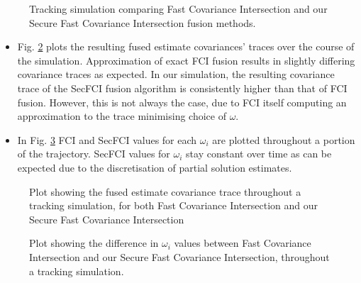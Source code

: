\documentclass[letterpaper, 10 pt, conference]{ieeeconf}  %
\begin{document}
\begin{figure}[tb]
   \begin{center}
      
   \end{center}
   \caption{Tracking simulation comparing Fast Covariance Intersection and our Secure Fast Covariance Intersection fusion methods.}
   \label{fig:fci_secfci_traj}
\end{figure}

\begin{itemize}
   \item Fig. \ref{fig:fci_secfci_trace} plots the resulting fused estimate covariances' traces over the course of the simulation. Approximation of exact FCI fusion results in slightly differing covariance traces as expected. In our simulation, the resulting covariance trace of the SecFCI fusion algorithm is consistently higher than that of FCI fusion. However, this is not always the case, due to FCI itself computing an approximation to the trace minimising choice of $\omega$.
   \item In Fig. \ref{fig:fci_secfci_omegas} FCI and SecFCI values for each $\omega_i$ are plotted throughout a portion of the trajectory. SecFCI values for $\omega_i$ stay constant over time as can be expected due to the discretisation of partial solution estimates.
\end{itemize}

\begin{figure}[tb]
   \begin{center}
      
   \end{center}
   \caption{Plot showing the fused estimate covariance trace throughout a tracking simulation, for both Fast Covariance Intersection and our Secure Fast Covariance Intersection}
   \label{fig:fci_secfci_trace}
\end{figure}

\begin{figure}[tb]
   \begin{center}
      
   \end{center}
   \caption{Plot showing the difference in $\omega_i$ values between Fast Covariance Intersection and our Secure Fast Covariance Intersection, throughout a tracking simulation.}
   \label{fig:fci_secfci_omegas}
\end{figure}

\end{document}
